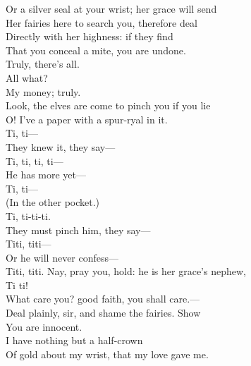 \documentclass[a4paper,oneside,12pt]{memoir}
\begin{document}
\begin{drama*}
Or a silver seal at your wrist; her grace will send\\
Her fairies here to search you, therefore deal\\
Directly with her highness: if they find\\
That you conceal a mite, you are undone.\\
\dapperspeaks Truly, there's all.\\
\facespeaks {} All what?\\
\dapperspeaks {} My money; truly.\\
\facespeaks Look, the elves are come to pinch you if you lie\\
\dapperspeaks O! I've a paper with a spur-ryal in it.\\
\dolspeaks Ti, ti---\\
\facespeaks {} They knew it, they say---\\
\dolspeaks {} Ti, ti, ti, ti---\\
\subtlespeaks {} He has more yet---\\
\dolspeaks Ti, ti---\\
\facespeaks {} (In the other pocket.)\\
\dolspeaks {} Ti, ti-ti-ti.\\
\subtlespeaks They must pinch him, they say---\\
\dolspeaks {} Titi, titi---\\
\subtlespeaks Or he will never confess---\\
\dolspeaks {} Titi, titi.
\facespeaks Nay, pray you, hold: he is her grace's
nephew,\\
\dolspeaks Ti ti!\\
\facespeaks {} What care you? good faith, you shall care.---\\
Deal plainly, sir, and shame the fairies. Show\\
You are innocent.\\
\dapperspeaks {} I have nothing but a half-crown\\
Of gold about my wrist, that my love gave me.\\

\end{drama*}
\end{document}
